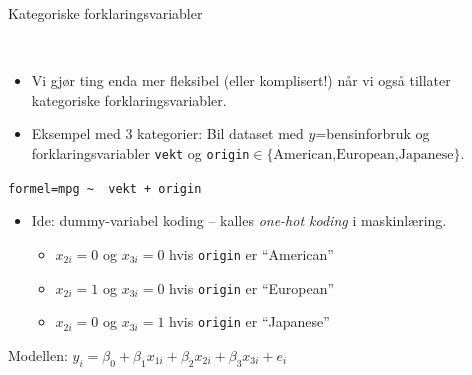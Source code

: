 \documentclass[10pt,ignorenonframetext,]{beamer}
\providecommand{\tightlist}{%
  \setlength{\itemsep}{0pt}\setlength{\parskip}{0pt}}
\begin{document}
\begin{frame}[fragile]

\begin{block}{Kategoriske forklaringsvariabler}

\(~\)

\begin{itemize}
\tightlist
\item
  Vi gjør ting enda mer fleksibel (eller komplisert!) når vi også
  tillater kategoriske forklaringsvariabler.
\end{itemize}

\vspace{2mm}

\begin{itemize}
\tightlist
\item
  Eksempel med 3 kategorier: Bil dataset med \(y\)=bensinforbruk og
  forklaringsvariabler \texttt{vekt} og
  \texttt{origin}\(\in \{\text{American,European,Japanese}\}\).
\end{itemize}

\centering

\vspace{4mm}

\texttt{formel=\textquotesingle{}mpg\ \textasciitilde{}\ \ vekt\ +\ origin\textquotesingle{}}

\flushleft

\vspace{4mm}

\begin{itemize}
\item
  Ide: dummy-variabel koding -- kalles \emph{one-hot koding} i
  maskinlæring.

  \begin{itemize}
  \tightlist
  \item
    \(x_{2i}=0\) og \(x_{3i}=0\) hvis \texttt{origin} er ``American''
  \item
    \(x_{2i}=1\) og \(x_{3i}=0\) hvis \texttt{origin} er ``European''
  \item
    \(x_{2i}=0\) og \(x_{3i}=1\) hvis \texttt{origin} er ``Japanese''
  \end{itemize}
\end{itemize}

\vspace{4mm}

Modellen:
\(y_i = \beta_0 + \beta_1 x_{1i} + \beta_2 x_{2i} + \beta_3 x_{3i} + e_i\)

\end{block}

\end{frame}
\end{document}
